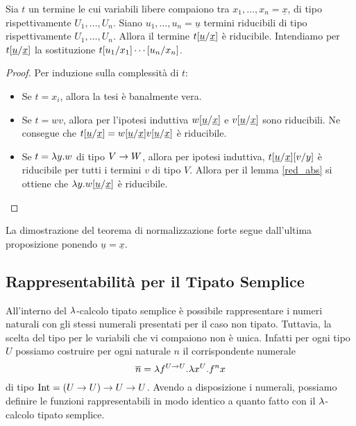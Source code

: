 \documentclass[]{marticle}
\begin{document}
\begin{block}[Proposizione]
    Sia $t$ un termine le cui variabili libere compaiono tra $x_1, \dots, x_n =
    \underline{x}$, di tipo rispettivamente $U_1, \dots, U_n$. Siano $u_1,
    \dots, u_n = \underline{u}$ termini riducibili di tipo rispettivamente $U_1,
    \dots, U_n$. Allora il termine $t[\underline{u}/\underline{x}]$ \`e
    riducibile. Intendiamo per $t[\underline{u}/\underline{x}]$ la
    sostituzione $t[u_1/x_1]\cdots[u_n/x_n]$.
\end{block}
\begin{proof}
    Per induzione sulla complessit\`a di $t$:
    \begin{itemize}
        \item Se $t=x_i$, allora la tesi \`e banalmente vera.
        \item Se $t=wv$, allora per l'ipotesi induttiva $w[\underline{u}/\underline{x}]$ e $v[\underline{u}/\underline{x}]$ sono
            riducibili. Ne consegue che $t[\underline{u}/\underline{x}] =
            w[\underline{u}/\underline{x}] v[\underline{u}/\underline{x}]$ \`e riducibile.
        \item Se $t=\lambda y. w$ di tipo $V\rightarrow W$, allora per ipotesi induttiva,
            $t[\underline{u}/\underline{x}] [v/y]$ \`e riducibile per
            tutti i termini $v$ di tipo $V$. Allora per il lemma \ref{red_abs}
            si ottiene che $\lambda y. w[\underline{u}/\underline{x}]$
            \`e riducibile.
    \end{itemize}
\end{proof}

La dimostrazione del teorema di normalizzazione forte segue dall'ultima
proposizione ponendo $\underline{u} = \underline{x}$.


\subsection{Rappresentabilit\`a per il Tipato Semplice}

All'interno del $\lambda$-calcolo tipato semplice \`e possibile rappresentare i
numeri naturali con gli stessi numerali presentati per il caso non tipato.
Tuttavia, la scelta del tipo per le variabili che vi compaiono non \`e unica.
Infatti per ogni tipo $U$ possiamo costruire per ogni naturale $n$ il
corrispondente numerale
\[
    \overline{n} = \lambda f^{U\rightarrow U} .\lambda x^U. f^n x
\]
di tipo $\text{Int} = (U\rightarrow U) \rightarrow U \rightarrow U$. Avendo a disposizione i numerali,
possiamo definire le funzioni rappresentabili in modo identico a quanto fatto
con il $\lambda$-calcolo tipato semplice.
\end{document}
